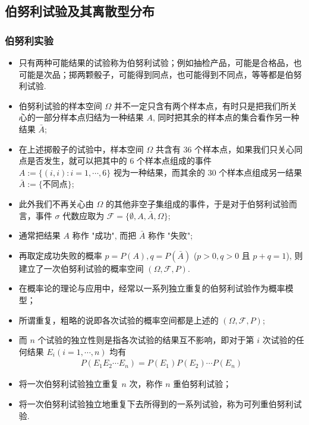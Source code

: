 \subsection{伯努利试验及其离散型分布}
\begin{frame}
	\frametitle{伯努利实验}
	\begin{itemize}[<+-|alert@+>]
		\item 只有两种可能结果的试验称为伯努利试验；例如抽检产品，可能是合格品，也可能是次品；掷两颗骰子，可能得到同点，也可能得到不同点，等等都是伯努利试验.
		\item 伯努利试验的样本空间 $\Omega$ 并不一定只含有两个样本点，有时只是把我们所关心的一部分样本点归结为一种结果 $A$, 同时把其余的样本点的集合看作另一种结果 $\bar{A}$;
		\item 在上述掷骰子的试验中，样本空间 $\Omega$ 共含有 36 个样本点，如果我们只关心同点是否发生，就可以把其中的 6 个样本点组成的事件 $A:=\{(i,i):i=1,\cdots, 6\}$ 视为一种结果，而其余的 30 个样本点组成另一结果 $\bar{A}:=\{\mbox{不同点}\}$;
		\item 此外我们不再关心由 $\Omega$ 的其他非空子集组成的事件，于是对于伯努利试验而言，事件 $\sigma$ 代数应取为 $\mathcal{F}=\{\emptyset, A, \bar{A}, \Omega\}$;
		\item 通常把结果 $A$ 称作 "成功", 而把 $\bar{A}$ 称作 "失败";
		\item 再取定成功失败的概率 $p=P (A), q=P (\bar{A})$ ($p>0,q>0$ 且 $p+q=1$), 则建立了一次伯努利试验的概率空间 $(\Omega,\mathcal{F},P)$.
	\end{itemize}
\end{frame}
\begin{frame}
	\begin{itemize}[<+-|alert@+>]
		\item 在概率论的理论与应用中，经常以一系列独立重复的伯努利试验作为概率模型；
		\item 所谓重复，粗略的说即各次试验的概率空间都是上述的 $(\Omega,\mathcal{F},P)$;
		\item 而 $n$ 个试验的独立性则是指各次试验的结果互不影响，即对于第 $i$ 次试验的任何结果 $E_i (i=1,\cdots, n)$ 均有
		      \begin{eqnarray*}
			      P(E_1E_2\cdots E_n)=P(E_1)P(E_2)\cdots P(E_n)
		      \end{eqnarray*}
		\item 将一次伯努利试验独立重复 $n$ 次，称作 $n$ 重伯努利试验；
		\item 将一次伯努利试验独立地重复下去所得到的一系列试验，称为可列重伯努利试验.
	\end{itemize}
\end{frame}

